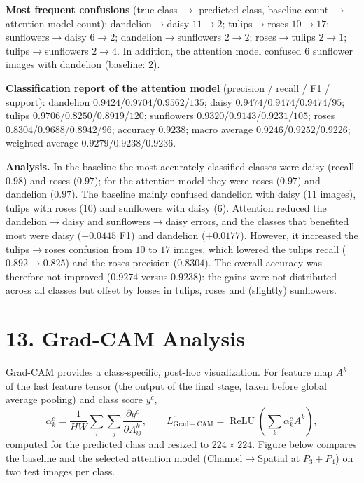 \documentclass[10pt]{article}
\begin{document}
\textbf{Most frequent confusions} (true class $\rightarrow$ predicted class,
baseline count $\rightarrow$ attention-model count): dandelion$\rightarrow$daisy
$11\rightarrow2$; tulips$\rightarrow$roses $10\rightarrow17$;
sunflowers$\rightarrow$daisy $6\rightarrow2$; dandelion$\rightarrow$sunflowers
$2\rightarrow2$; roses$\rightarrow$tulips $2\rightarrow1$;
tulips$\rightarrow$sunflowers $2\rightarrow4$. In addition, the attention
model confused $6$ sunflower images with dandelion (baseline: $2$).

\textbf{Classification report of the attention model} (precision / recall /
F1 / support): dandelion $0.9424$\slash $0.9704$\slash $0.9562$\slash $135$; daisy
$0.9474$\slash $0.9474$\slash $0.9474$\slash $95$; tulips $0.9706$\slash $0.8250$\slash $0.8919$\slash $120$; sunflowers
$0.9320$\slash $0.9143$\slash $0.9231$\slash $105$; roses $0.8304$\slash $0.9688$\slash $0.8942$\slash $96$; accuracy
$0.9238$; macro average $0.9246$\slash $0.9252$\slash $0.9226$; weighted average
$0.9279$\slash $0.9238$\slash $0.9236$.

\textbf{Analysis.} In the baseline the most accurately classified classes were
daisy (recall $0.98$) and roses ($0.97$); for the attention model they were
roses ($0.97$) and dandelion ($0.97$). The baseline mainly confused dandelion
with daisy ($11$ images), tulips with roses ($10$) and sunflowers with daisy
($6$). Attention reduced the dandelion$\rightarrow$daisy and
sunflowers$\rightarrow$daisy errors, and the classes that benefited most were
daisy ($+0.0445$ F1) and dandelion ($+0.0177$). However, it increased the
tulips$\rightarrow$roses confusion from $10$ to $17$ images, which lowered
the tulips recall ($0.892\rightarrow0.825$) and the roses precision
($0.8304$). The overall accuracy was therefore not improved ($0.9274$ versus
$0.9238$): the gains were not distributed across all classes but offset by
losses in tulips, roses and (slightly) sunflowers.

\section*{13. Grad-CAM Analysis}

Grad-CAM provides a class-specific, post-hoc visualization. For feature map
$A^k$ of the last feature tensor (the output of the final stage, taken
before global average pooling) and class score $y^c$,
\[
\alpha_k^c
=
\frac{1}{HW}
\sum_i
\sum_j
\frac{\partial y^c}
{\partial A_{ij}^k},
\qquad
L_{\mathrm{Grad-CAM}}^c
=
\operatorname{ReLU}
\left(
\sum_k
\alpha_k^c A^k
\right),
\]
computed for the predicted class and resized to $224\times224$.
Figure below compares the baseline and the selected attention model
(Channel$\rightarrow$Spatial at $P_3{+}P_4$) on two test images per class.
\end{document}
